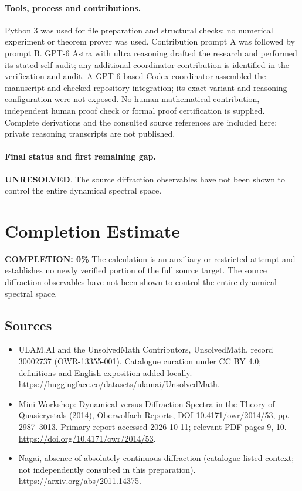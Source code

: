\documentclass[11pt]{article}
\begin{document}
\paragraph{Tools, process and contributions.}
Python 3 was used for file preparation and structural checks; no numerical experiment or theorem prover was used. Contribution prompt A was followed by prompt B. GPT-6 Astra with ultra reasoning drafted the research and performed its stated self-audit; any additional coordinator contribution is identified in the verification and audit. A GPT-6-based Codex coordinator assembled the manuscript and checked repository integration; its exact variant and reasoning configuration were not exposed. No human mathematical contribution, independent human proof check or formal proof certification is supplied. Complete derivations and the consulted source references are included here; private reasoning transcripts are not published.

\paragraph{Final status and first remaining gap.}
\textbf{UNRESOLVED}. The source diffraction observables have not been shown to control the entire dynamical spectral space.

\section{Completion Estimate}
\noindent\textbf{COMPLETION: 0\%}
The calculation is an auxiliary or restricted attempt and establishes no newly verified portion of the full source target. The source diffraction observables have not been shown to control the entire dynamical spectral space.

\subsection{Sources}
\begin{itemize}
\item[\hypertarget{source:30002737:1}{S1}] ULAM.AI and the UnsolvedMath Contributors, UnsolvedMath, record 30002737 (OWR-13355-001). Catalogue curation under CC BY 4.0; definitions and English exposition added locally.
\url{https://huggingface.co/datasets/ulamai/UnsolvedMath}.
\item[\hypertarget{source:30002737:2}{S2}] Mini-Workshop: Dynamical versus Diffraction Spectra in the Theory of Quasicrystals (2014), Oberwolfach Reports, DOI 10.4171/owr/2014/53, pp. 2987--3013. Primary report accessed 2026-10-11; relevant PDF pages 9, 10.
\url{https://doi.org/10.4171/owr/2014/53}.
\item[\hypertarget{source:30002737:3}{S3}] Nagai, absence of absolutely continuous diffraction (catalogue-listed context; not independently consulted in this preparation).
\url{https://arxiv.org/abs/2011.14375}.
\end{itemize}
\label{end:30002737}
\end{document}
